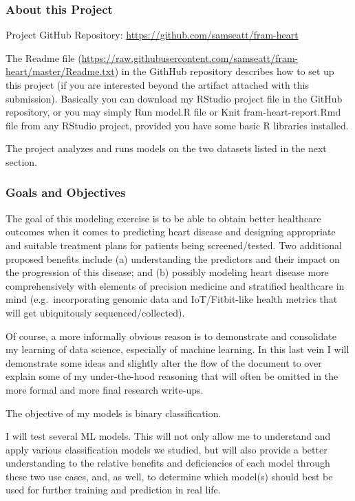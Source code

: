 \documentclass[]{article}
\begin{document}
\subsubsection{About this Project}\label{about-this-project}

Project GitHub Repository: \url{https://github.com/samseatt/fram-heart}

The Readme file
(\url{https://raw.githubusercontent.com/samseatt/fram-heart/master/Readme.txt})
in the GithHub repository describes how to set up this project (if you
are interested beyond the artifact attached with this submission).
Basically you can download my RStudio project file in the GitHub
repository, or you may simply Run model.R file or Knit
fram-heart-report.Rmd file from any RStudio project, provided you have
some basic R libraries installed.

The project analyzes and runs models on the two datasets listed in the
next section.

\subsubsection{Goals and Objectives}\label{goals-and-objectives}

The goal of this modeling exercise is to be able to obtain better
healthcare outcomes when it comes to predicting heart disease and
designing appropriate and suitable treatment plans for patients being
screened/tested. Two additional proposed benefits include (a)
understanding the predictors and their impact on the progression of this
disease; and (b) possibly modeling heart disease more comprehensively
with elements of precision medicine and stratified healthcare in mind
(e.g.~incorporating genomic data and IoT/Fitbit-like health metrics that
will get ubiquitously sequenced/collected).

Of course, a more informally obvious reason is to demonstrate and
consolidate my learning of data science, especially of machine learning.
In this last vein I will demonstrate some ideas and slightly alter the
flow of the document to over explain some of my under-the-hood reasoning
that will often be omitted in the more formal and more final research
write-ups.

The objective of my models is binary classification.

I will test several ML models. This will not only allow me to understand
and apply various classification models we studied, but will also
provide a better understanding to the relative benefits and deficiencies
of each model through these two use cases, and, as well, to determine
which model(s) should best be used for further training and prediction
in real life.
\end{document}
